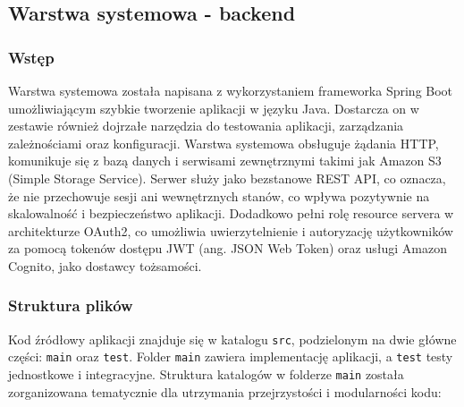 \documentclass[../../main.tex]{subfiles}
\begin{document}
    \subsection{Warstwa systemowa - backend}

    \subsubsection{Wstęp}
    Warstwa systemowa została napisana z wykorzystaniem frameworka Spring Boot umożliwiającym szybkie tworzenie aplikacji w języku Java.
    Dostarcza on w zestawie również dojrzałe narzędzia do testowania aplikacji, zarządzania zależnościami oraz konfiguracji.
    Warstwa systemowa obsługuje żądania HTTP, komunikuje się z bazą danych i serwisami zewnętrznymi takimi jak Amazon S3 (Simple Storage Service).
    Serwer służy jako bezstanowe REST API, co oznacza, że nie przechowuje sesji ani wewnętrznych stanów, co wpływa pozytywnie na skalowalność i bezpieczeństwo aplikacji.
    Dodadkowo pełni rolę resource servera w architekturze OAuth2, co umożliwia uwierzytelnienie i autoryzację użytkowników za pomocą tokenów dostępu JWT (ang. JSON Web Token) oraz usługi Amazon Cognito, jako dostawcy tożsamości.

    \subsubsection{Struktura plików}
    Kod źródłowy aplikacji znajduje się w katalogu \texttt{src}, podzielonym na dwie główne części: \texttt{main} oraz \texttt{test}.
    Folder \texttt{main} zawiera implementację aplikacji, a \texttt{test} testy jednostkowe i integracyjne.
    Struktura katalogów w folderze \texttt{main} została zorganizowana tematycznie dla utrzymania przejrzystości i modularności kodu:
\end{document}
